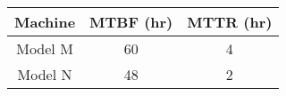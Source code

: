 \begin{center}
\begin{tabular}{|c|c|c|}
\hline
{Machine} & {MTBF (hr)} & {MTTR (hr)} \\ \hline
Model M & 60 & 4 \\ \hline
Model N & 48 & 2 \\ \hline 
\end{tabular}
\end{center}